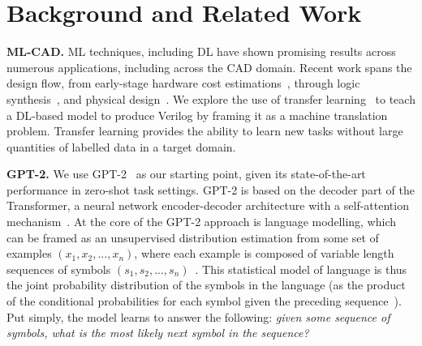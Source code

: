 \section{Background and Related Work}
\label{sec:related}

\textbf{ML-CAD.}
\ac{ML} techniques, including \ac{DL} have shown promising results across numerous applications, including across the \ac{CAD} domain. 
Recent work spans the design flow, from early-stage hardware cost estimations~\cite{servadei_accurate_2019}, through logic synthesis~\cite{yu_developing_2018}, and physical design~\cite{kahng_machine_2018}. %
We explore the use of transfer learning~\cite{pan_survey_2010} to teach a \ac{DL}-based model to produce Verilog by framing it as a machine translation problem. %
Transfer learning provides the ability to learn new tasks without large quantities of labelled data in a target domain. %

\textbf{GPT-2.}
We use GPT-2~\cite{radford2019language} as our starting point, given its state-of-the-art performance in zero-shot task settings. 
GPT-2 is based on the decoder part of the Transformer, a neural network encoder-decoder architecture with a self-attention mechanism~\cite{vaswani_attention_2017}.  
At the core of the GPT-2 approach is language modelling, which can be framed as an unsupervised distribution estimation from some set of examples $(x_1, x_2, ..., x_n)$, where each example is composed of variable length sequences of symbols $(s_1, s_2, ..., s_n)$~\cite{radford2019language}. 
This statistical model of language is thus the joint probability distribution of the symbols in the language (as the product of the conditional probabilities for each symbol given the preceding sequence~\cite{bengio_neural_2003}). 
Put simply, the model learns to answer the following: \emph{given some sequence of symbols, what is the most likely next symbol in the sequence?} 


